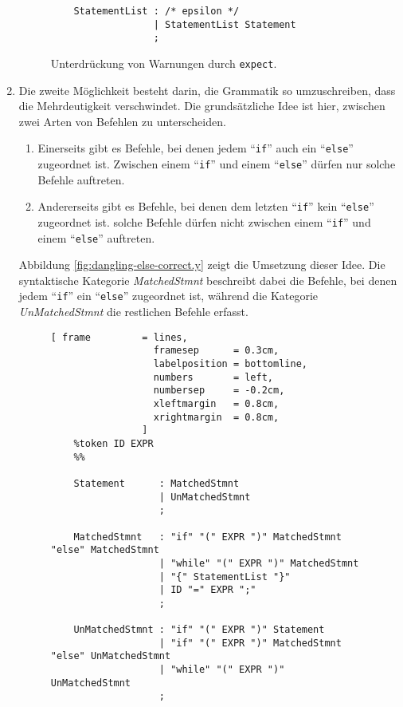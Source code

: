 \begin{enumerate}
\begin{figure}[!ht]
\begin{Verbatim}
    StatementList : /* epsilon */
                  | StatementList Statement
                  ;
\end{Verbatim}
\vspace*{-0.3cm}
\caption{Unterdr\"uckung von Warnungen durch \texttt{expect}.}
\label{fig:dangling-else-expect.y}
\end{figure}
\item Die zweite M\"oglichkeit besteht darin, die Grammatik so umzuschreiben, dass die Mehrdeutigkeit
      verschwindet.   Die grunds\"atzliche Idee ist hier, zwischen zwei Arten von Befehlen zu
      unterscheiden.
      \begin{enumerate}
      \item Einerseits gibt es Befehle, bei denen jedem ``\texttt{if}'' auch ein ``\texttt{else}''
            zugeordnet ist.  Zwischen einem ``\texttt{if}'' und einem ``\texttt{else}'' d\"urfen nur
            solche Befehle auftreten.
      \item Andererseits gibt es Befehle, bei denen dem letzten ``\texttt{if}'' kein
            ``\texttt{else}'' zugeordnet ist.  solche Befehle d\"urfen nicht zwischen einem
            ``\texttt{if}'' und einem ``\texttt{else}'' auftreten.
      \end{enumerate}
      Abbildung \ref{fig:dangling-else-correct.y} zeigt die Umsetzung dieser Idee.
      Die syntaktische Kategorie \textsl{MatchedStmnt} beschreibt dabei die Befehle, 
      bei denen jedem ``\texttt{if}'' ein ``\texttt{else}'' zugeordnet ist, w\"ahrend die Kategorie 
      \textsl{UnMatchedStmnt} die restlichen Befehle erfasst.

\begin{figure}[!ht]
\centering
\begin{Verbatim}[ frame         = lines, 
                  framesep      = 0.3cm, 
                  labelposition = bottomline,
                  numbers       = left,
                  numbersep     = -0.2cm,
                  xleftmargin   = 0.8cm,
                  xrightmargin  = 0.8cm,
                ]
    %token ID EXPR 
    %%
    
    Statement      : MatchedStmnt
                   | UnMatchedStmnt
                   ;
    
    MatchedStmnt   : "if" "(" EXPR ")" MatchedStmnt "else" MatchedStmnt
                   | "while" "(" EXPR ")" MatchedStmnt 
                   | "{" StatementList "}"
                   | ID "=" EXPR ";"
                   ;
    
    UnMatchedStmnt : "if" "(" EXPR ")" Statement 
                   | "if" "(" EXPR ")" MatchedStmnt "else" UnMatchedStmnt
                   | "while" "(" EXPR ")" UnMatchedStmnt
                   ;
    

\end{Verbatim}
\end{figure}
\end{enumerate}
